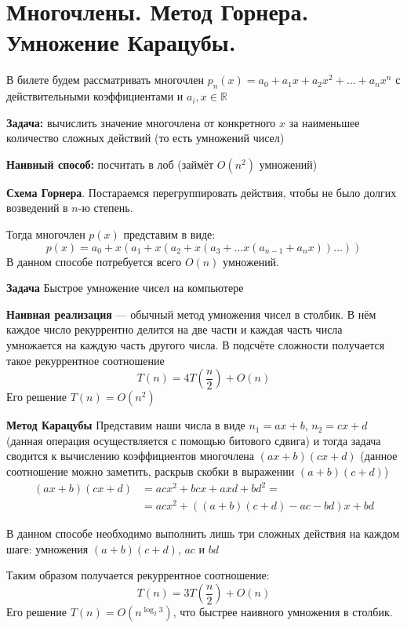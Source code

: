 \section{Многочлены. Метод Горнера. Умножение Карацубы.}

В билете будем рассматривать многочлен $p_n(x) = a_0 + a_1x + a_2x^2 + \dots + a_n x^n$ с действительными коэффициентами и $a_i, x \in \mathbb{R}$

\textbf{Задача:} вычислить значение многочлена от конкретного $x$ за наименьшее количество сложных действий (то есть умножений чисел)

\textbf{Наивный способ:} посчитать в лоб (займёт $O(n^2)$ умножений)

\textbf{Схема Горнера}.
Постараемся перегруппировать действия, чтобы не было долгих возведений в $n$-ю степень.

Тогда многочлен $p(x)$ представим в виде:
$$
	p(x) = a_0 + x(a_1 + x(a_2 + x(a_3 + \dots x(a_{n-1} + a_n x))\dots))
$$
В данном способе потребуется всего $O(n)$ умножений.

\textbf{Задача} Быстрое умножение чисел на компьютере

\textbf{Наивная реализация} --- обычный метод умножения чисел в столбик.
В нём каждое число рекуррентно делится на две части и каждая часть числа умножается на каждую часть другого числа.
В подсчёте сложности получается такое рекуррентное соотношение
$$T(n) = 4T\left(\frac{n}{2}\right) + O(n)$$
Его решение $T(n) = O(n^2)$

\textbf{Метод Карацубы}
Представим наши числа в виде $n_1 = ax + b$, $n_2 = cx + d$ (данная операция осуществляется с помощью битового сдвига) и тогда задача сводится к вычислению коэффициентов многочлена $(ax+b)(cx+d)$
(данное соотношение можно заметить, раскрыв скобки в выражении $(a + b)(c + d)$)
\begin{align*}
	(ax+b)(cx+d) &= acx^2 + bcx + axd + bd^2 =  \\
	&= acx^2 + ((a + b)(c + d) - ac - bd)x + bd
\end{align*}
	
В данном способе необходимо выполнить лишь три сложных действия на каждом шаге: умножения $(a + b)(c + d)$, $ac$ и $bd$


Таким образом получается рекуррентное соотношение:
$$T(n) = 3T\left(\frac{n}{2}\right) + O(n)$$
Его решение $T(n) = O\left(n^{\log_2 3}\right)$, что быстрее наивного умножения в столбик.